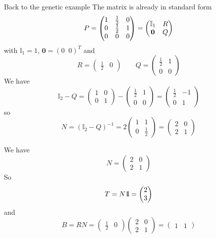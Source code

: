 \documentclass[aspectratio=169]{beamer}
\begin{document}
\begin{frame}{Back to the genetic example}
The matrix is already in standard form
\[
P=
\begin{pmatrix}
1 & \frac 12 & 0 \\
0 & \frac 12 & 1 \\
0 & 0 & 0
\end{pmatrix}
=\begin{pmatrix}
\mathbb{I}_1 & R \\
\b0 & Q
\end{pmatrix}
\]
with $\mathbb{I}_1=1$, $\mathbf{0}=(0\;\; 0)^T$ and
\[
R=\begin{pmatrix}
\frac 12 & 0
\end{pmatrix}
\qquad
Q=\begin{pmatrix}
\frac 12 & 1\\
0 & 0
\end{pmatrix}
\]
We have
\[
\mathbb{I}_2-Q=\begin{pmatrix}
1 & 0 \\
0 & 1
\end{pmatrix}
-\begin{pmatrix}
\frac 12 & 1\\
0 & 0
\end{pmatrix}
=\begin{pmatrix}
\frac 12 & -1\\
0 & 1
\end{pmatrix}
\]
so
\[
N=(\mathbb{I}_2-Q)^{-1}=
2\begin{pmatrix}
1 & 1 \\
0 & \frac 12
\end{pmatrix}=
\begin{pmatrix}
2 & 0 \\
2 & 1
\end{pmatrix}
\]
\end{frame}


\begin{frame}
We have
\[
N=
\begin{pmatrix}
	2 & 0 \\
	2 & 1
\end{pmatrix}
\]
So
\[
T=N\nbOne=\begin{pmatrix}
2\\
3
\end{pmatrix}
\]
and
\[
B=RN=
\begin{pmatrix}
	\frac 12 & 0
\end{pmatrix}
\begin{pmatrix}
	2 & 0 \\
	2 & 1
\end{pmatrix}
=
\begin{pmatrix}
1 & 1
\end{pmatrix}
\]
\end{frame}
\end{document}
